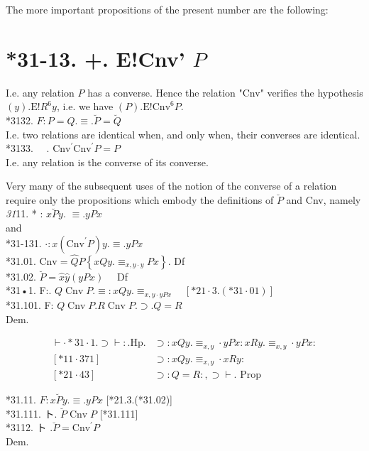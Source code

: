 \documentclass[10pt]{article}
\begin{document}
The more important propositions of the present number are the following:

\section*{*31-13. +. E!Cnv' $P$}
I.e. any relation $P$ has a converse. Hence the relation "Cnv" verifies the hypothesis $(y) . \mathrm{E}!R^{6} y$, i.e. we have $(P) . \mathrm{E}!\mathrm{Cnv}^{6} P$.\\
*3132. $F: P=Q . \equiv . \breve{P}=\breve{Q}$\\
I.e. two relations are identical when, and only when, their converses are identical.\\
*3133. $\quad$. $\mathrm{Cnv}^{\prime} \mathrm{Cnv}^{\prime} P=P$\\
I.e. any relation is the converse of its converse.

Very many of the subsequent uses of the notion of the converse of a relation require only the propositions which embody the definitions of $\breve{P}$ and Cnv, namely\\
\textit{31}11. * : $x \breve{P} y$. $\equiv . y P x$\\
and\\
*31-131. $\cdot: x\left(\mathrm{Cnv}^{\prime} P\right) y . \equiv . y P x$\\
*31.01. $\mathrm{Cnv}=\hat{Q} \hat{P}\left\{x Q y . \equiv_{x, y \cdot y} P x\right\}$. Df\\
*31.02. $\breve{P}=\hat{x} \hat{y}(y P x) \quad$ Df\\
*31•1. F:. $Q \operatorname{Cnv} P . \equiv: x Q y . \equiv_{x, y \cdot y P x} \quad[* 21 \cdot 3 .(* 31 \cdot 01)]$\\
*31.101. F: $Q \operatorname{Cnv} P . R \operatorname{Cnv} P . \supset . Q=R$\\
Dem.

$$
\begin{array}{ll}
\vdash \cdot * 31 \cdot 1 . \supset \vdash: . \mathrm{Hp} . & \supset: x Q y . \equiv_{x, y} \cdot y P x: x R y . \equiv_{x, y} \cdot y P x: \\
{[* 11 \cdot 371]} & \supset: x Q y . \equiv_{x, y} \cdot x R y: \\
{[* 21 \cdot 43]} & \supset: Q=R:, \supset \vdash . \text { Prop }
\end{array}
$$

*31.11. $F: x \breve{P} y . \equiv . y P x$ [*21.3.(*31.02)]\\
*31.111. ト. $\breve{P} \operatorname{Cnv} P$ [*31.111]\\
*3112. ト $. \breve{P}=\mathrm{Cnv}^{\prime} P$\\
Dem.
\end{document}
